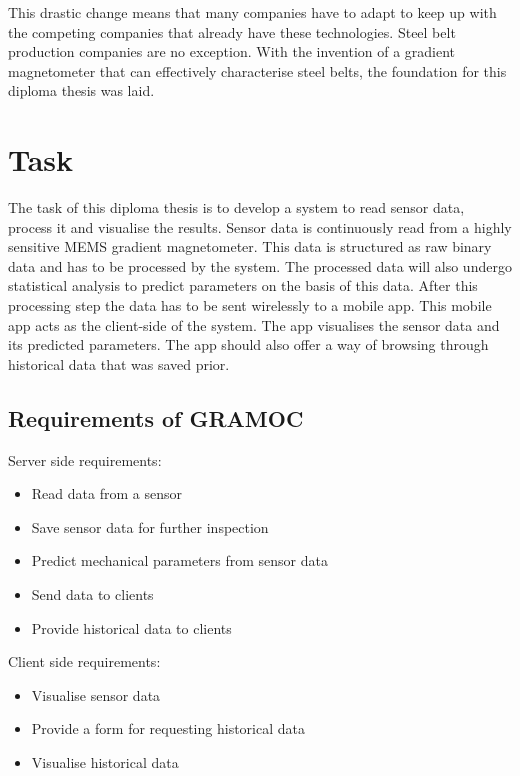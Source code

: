 This drastic change means that many companies have to adapt to keep up with the competing companies that already have these technologies. Steel belt production companies are no exception. With the invention of a gradient magnetometer that can effectively characterise steel belts, the foundation for this diploma thesis was laid.

\section{Task}

The task of this diploma thesis is to develop a system to read sensor data, process it and visualise the results. Sensor data is continuously read from a highly sensitive MEMS gradient magnetometer. This data is structured as raw binary data and has to be processed by the system. The processed data will also undergo statistical analysis to predict parameters on the basis of this data. After this processing step the data has to be sent wirelessly to a mobile app. This mobile app acts as the client-side of the system. The app visualises the sensor data and its predicted parameters. The app should also offer a way of browsing through historical data that was saved prior.

\subsection{Requirements of GRAMOC}

Server side requirements:

\begin{itemize}
    \item Read data from a sensor
    \item Save sensor data for further inspection
    \item Predict mechanical parameters from sensor data
    \item Send data to clients
    \item Provide historical data to clients
\end{itemize}

Client side requirements:

\begin{itemize}
    \item Visualise sensor data
    \item Provide a form for requesting historical data
    \item Visualise historical data
\end{itemize}

